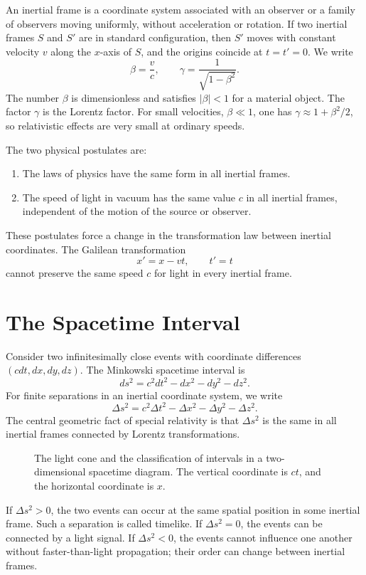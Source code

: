 An inertial frame is a coordinate system associated with an observer or a family
of observers moving uniformly, without acceleration or rotation. If two inertial
frames \(S\) and \(S'\) are in standard configuration, then \(S'\) moves with
constant velocity \(v\) along the \(x\)-axis of \(S\), and the origins coincide
at \(t=t'=0\). We write
\[
\beta=\frac{v}{c},
\qquad
\gamma=\frac{1}{\sqrt{1-\beta^2}}.
\]
The number \(\beta\) is dimensionless and satisfies \(|\beta|<1\) for a material
object. The factor \(\gamma\) is the Lorentz factor. For small velocities,
\(\beta\ll 1\), one has \(\gamma\approx 1+\beta^2/2\), so relativistic effects
are very small at ordinary speeds.

The two physical postulates are:
\begin{enumerate}
    \item The laws of physics have the same form in all inertial frames.
    \item The speed of light in vacuum has the same value \(c\) in all inertial
    frames, independent of the motion of the source or observer.
\end{enumerate}
These postulates force a change in the transformation law between inertial
coordinates. The Galilean transformation
\[
x'=x-vt,
\qquad
 t'=t
\]
cannot preserve the same speed \(c\) for light in every inertial frame.

\clearpage

\section{The Spacetime Interval}

Consider two infinitesimally close events with coordinate differences
\((cdt,dx,dy,dz)\). The Minkowski spacetime interval is
\[
ds^2=c^2dt^2-dx^2-dy^2-dz^2.
\]
For finite separations in an inertial coordinate system, we write
\[
\Delta s^2=c^2\Delta t^2-\Delta x^2-\Delta y^2-\Delta z^2.
\]
The central geometric fact of special relativity is that \(\Delta s^2\) is the
same in all inertial frames connected by Lorentz transformations.

\begin{figure}[h]
\centering

\caption{The light cone and the classification of intervals in a two-dimensional
spacetime diagram. The vertical coordinate is \(ct\), and the horizontal
coordinate is \(x\).}
\end{figure}

If \(\Delta s^2>0\), the two events can occur at the same spatial position in
some inertial frame. Such a separation is called timelike. If \(\Delta s^2=0\),
the events can be connected by a light signal. If \(\Delta s^2<0\), the events
cannot influence one another without faster-than-light propagation; their order
can change between inertial frames.

